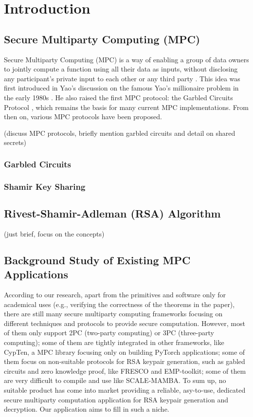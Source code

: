 
\chapter{Introduction}

\section{Secure Multiparty Computing (MPC)}

Secure Multiparty Computing (MPC) is a way of enabling a group of data owners to jointly compute a function using all their data as inputs, without disclosing any participant's private input to each other or any third party \cite{evans2018pragmatic}. This idea was first introduced in Yao's discussion on the famous Yao's millionaire problem in the early 1980s \cite{yao1982protocols}. He also raised the first MPC protocol: the Garbled Circuits Protocol \cite{yao1982protocols}, which remains the basis for many current MPC implementations. From then on, various MPC protocols have been proposed.

(discuss MPC protocols, briefly mention garbled circuits and detail on shared secrets)

\subsection{Garbled Circuits}

\subsection{Shamir Key Sharing}

\section{Rivest-Shamir-Adleman (RSA) Algorithm}

(just brief, focus on the concepts)

\section{Background Study of Existing MPC Applications}

According to our research, apart from the primitives and software only for academical uses (e.g., verifying the correctness of the theorems in the paper), there are still many secure multiparty computing frameworks focusing on different techniques and protocols to provide secure computation. However, most of them only support 2PC (two-party computing) or 3PC (three-party computing); some of them are tightly integrated in other frameworks, like CypTen, a MPC library focusing only on building PyTorch applications; some of them focus on non-suitable protocols for RSA keypair generation, such as gabled circuits and zero knowledge proof, like FRESCO and EMP-toolkit; some of them are very difficult to compile and use like SCALE-MAMBA. To sum up, no suitable product has come into market providing a reliable, asy-to-use, dedicated secure multiparty computation application for RSA keypair generation and decryption. Our application aims to fill in such a niche.

